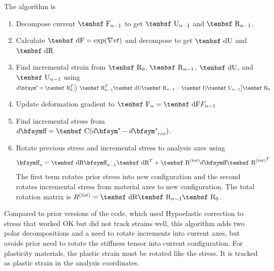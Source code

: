 \documentclass[11pt]{book}
\def\C{\hbox{\tenbsf C}}
\def\F{\hbox{\tenbsf F}}
\def\dF{\hbox{\tenbsf dF}}
\def\I{\hbox{\tenbsf I}}
\def\R{\hbox{\tenbsf R}}
\def\dR{\hbox{\tenbsf dR}}
\def\U{\hbox{\tenbsf U}}
\def\dU{\hbox{\tenbsf dU}}
\def\st{{\hbox{\bfsym\char'033}}}
\def\et{{\hbox{\bfsym\char'042}}}
\begin{document}
The algorithm is
\begin{enumerate}
\item Decompose current $\F_{n-1}$ to get $\U_{n-1}$ and $\R_{n-1}$.
\item Calculate $\dF = \exp(\nabla v t)$ and decompose to get $\dU$ and $\dR$
\item Find incremental strain from $\R_0$, $\R_{n-1}$, $\dU$, and $\U_{n-1}$ using $d\et=\R_0^T\bigl[(\ \R_{n-1}^T \dU \R_{n-1} - \I)\U_{n-1}\bigr]\R_0$
\item Update deformation gradient to $\F_n = \dF F_{n-1}$
\item Find incremental stress from $d\st =  \C(d\et - d\et_{res})$.
\item Rotate previous stress and incremental stress to analysis axes using
\begin{equation}
   \st_n = \dR \st_{n-1}\dR^T + \R^{(tot)}d\st{\R^{(tot)}}^T
\end{equation}
The first term rotates prior stress into new configuration and the second rotates incremental stress from material axes to new configuration. The total rotation matrix is $R^{(tot)} = \dR \R_{n-1}\R_0$.
\end{enumerate}
Compared to prior versions of the code, which used Hypoelastic correction to stress that worked OK but did not track strains well, this algorithm adds two polar decompositions and a need to rotate increments into current axes, but avoids prior need to rotate the stiffness tensor into current configuration. For plasticity materials, the plastic strain must be rotated like the stress. It is tracked as plastic strain in the analysis coordinates.
\end{document}
